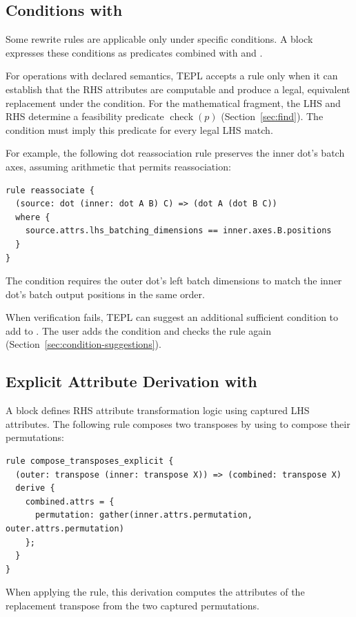 \subsection{Conditions with \texorpdfstring{}{where}}
\label{sec:where}
Some rewrite rules are applicable only under specific conditions. A
 block expresses these conditions as predicates combined with
\code{&&} and \code{||}.

For operations with declared semantics, TEPL accepts a rule only when it can
establish that the RHS attributes are computable and produce a legal,
equivalent replacement under the  condition. For the mathematical
fragment, the LHS and RHS determine a feasibility predicate
$\operatorname{check}(p)$ (Section~\ref{sec:find}). The  condition
must imply this predicate for every legal LHS match.

For example, the following dot reassociation rule preserves the inner dot's
batch axes, assuming arithmetic that permits reassociation:
\begin{lstlisting}[language=TEPL]
rule reassociate {
  (source: dot (inner: dot A B) C) => (dot A (dot B C))
  where {
    source.attrs.lhs_batching_dimensions == inner.axes.B.positions
  }
}
\end{lstlisting}
The condition requires the outer dot's left batch dimensions to match the
inner dot's batch output positions in the same order.

When verification fails, TEPL can suggest an additional sufficient condition
to add to . The user adds the condition and checks the rule again
(Section~\ref{sec:condition-suggestions}).

\subsection{Explicit Attribute Derivation with \texorpdfstring{}{derive}}
A  block defines RHS attribute transformation logic using
captured LHS attributes. The following rule composes two transposes by
using  to compose their permutations:
\begin{lstlisting}[language=TEPL]
rule compose_transposes_explicit {
  (outer: transpose (inner: transpose X)) => (combined: transpose X)
  derive {
    combined.attrs = {
      permutation: gather(inner.attrs.permutation, outer.attrs.permutation)
    };
  }
}
\end{lstlisting}
When applying the rule, this derivation computes the attributes of the
replacement transpose from the two captured permutations.

